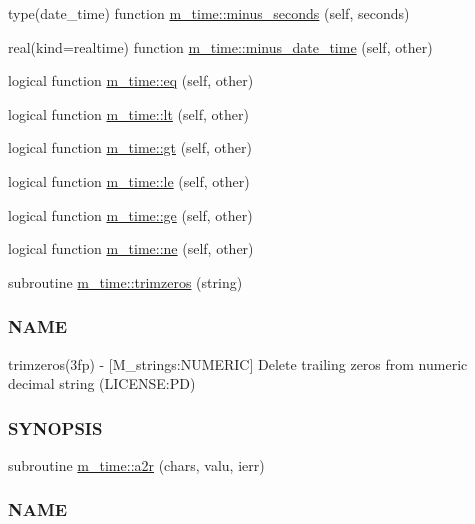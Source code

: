 \begin{DoxyCompactItemize}
\item 
type(date\+\_\+time) function \mbox{\hyperlink{namespacem__time_a0d241cbb8f2e30a64b53f4aae4100709}{m\+\_\+time\+::minus\+\_\+seconds}} (self, seconds)
\item 
real(kind=realtime) function \mbox{\hyperlink{namespacem__time_ae81a89463c40f33a14b1b2d49f797643}{m\+\_\+time\+::minus\+\_\+date\+\_\+time}} (self, other)
\item 
logical function \mbox{\hyperlink{namespacem__time_a7d365fb381fa8f5f79a4263c9f678b98}{m\+\_\+time\+::eq}} (self, other)
\item 
logical function \mbox{\hyperlink{namespacem__time_a2cc7f6c40c8ef5aeef08cd51912987d7}{m\+\_\+time\+::lt}} (self, other)
\item 
logical function \mbox{\hyperlink{namespacem__time_a62a48ba3b42ccf837b48584293231021}{m\+\_\+time\+::gt}} (self, other)
\item 
logical function \mbox{\hyperlink{namespacem__time_a498bb2830d153743d9624e65e92d4f6c}{m\+\_\+time\+::le}} (self, other)
\item 
logical function \mbox{\hyperlink{namespacem__time_aae8c0dfd78a61889a0d6444448ac0bb9}{m\+\_\+time\+::ge}} (self, other)
\item 
logical function \mbox{\hyperlink{namespacem__time_ac0e0df383f424680ce59f5540e02348b}{m\+\_\+time\+::ne}} (self, other)
\item 
subroutine \mbox{\hyperlink{namespacem__time_a5d9e4a12c3418d67dc69a87780053d67}{m\+\_\+time\+::trimzeros}} (string)
\begin{DoxyCompactList}\small\item\em \subsubsection*{N\+A\+ME}

trimzeros(3fp) -\/ \mbox{[}M\+\_\+strings\+:N\+U\+M\+E\+R\+IC\mbox{]} Delete trailing zeros from numeric decimal string (L\+I\+C\+E\+N\+SE\+:PD) \subsubsection*{S\+Y\+N\+O\+P\+S\+IS}\end{DoxyCompactList}\item 
subroutine \mbox{\hyperlink{namespacem__time_a85f3492133b49248e415771ff4da0b95}{m\+\_\+time\+::a2r}} (chars, valu, ierr)
\begin{DoxyCompactList}\small\item\em \subsubsection*{N\+A\+ME}


\end{DoxyCompactList}
\end{DoxyCompactItemize}
